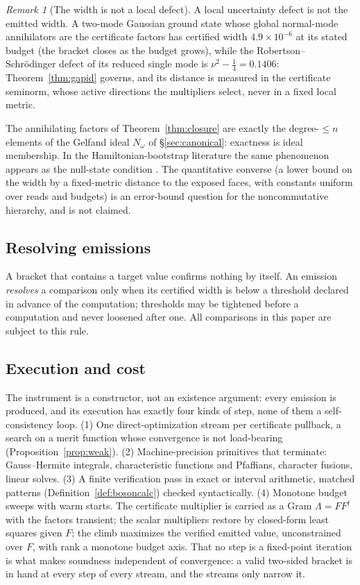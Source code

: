 \documentclass[11pt]{article}
\theoremstyle{definition}
\theoremstyle{remark}
\newtheorem{remark}[theorem]{Remark}
\begin{document}
\begin{remark}[The width is not a local defect]\label{rem:widthdefect}
A local uncertainty defect is not the emitted width.  A two-mode Gaussian
ground state whose global normal-mode annihilators are the certificate
factors has certified width $4.9\times10^{-6}$ at its stated budget (the
bracket closes as the budget grows), while the
Robertson--Schr\"odinger defect of its reduced single mode is $\nu^2 -
\tfrac14 = 0.1406$: Theorem~\ref{thm:gapid} governs, and its distance is
measured in the certificate seminorm, whose active directions the
multipliers select, never in a fixed local metric.
\end{remark}

The annihilating factors of Theorem~\ref{thm:closure} are exactly the
degree-$\le n$ elements of the Gelfand ideal $N_\omega$ of
\S\ref{sec:canonical}: exactness is ideal membership.  In the
Hamiltonian-bootstrap literature the same phenomenon appears as the
null-state condition \cite{guoli}.  The quantitative
converse (a lower bound on the width by a fixed-metric distance to the
exposed faces, with constants uniform over reads and budgets) is an
error-bound question for the noncommutative hierarchy, and is not claimed.

\subsection{Resolving emissions}\label{sec:resolving}
A bracket that contains a target value confirms nothing by itself.  An
emission \emph{resolves} a comparison only when its certified width is
below a threshold declared in advance of the computation; thresholds may
be tightened before a computation and never loosened after one.  All
comparisons in this paper are subject to this rule.

\subsection{Execution and cost}\label{sec:execution}
The instrument is a constructor, not an existence argument: every emission
is produced, and its execution has exactly four kinds of step, none of them
a self-consistency loop.  (1) One direct-optimization stream per
certificate pullback, a search on a merit function whose convergence is not
load-bearing (Proposition~\ref{prop:weak}).  (2) Machine-precision
primitives that terminate: Gauss--Hermite integrals, characteristic
functions and Pfaffians, character fusions, linear solves.  (3) A finite
verification pass in exact or interval arithmetic, matched patterns
(Definition~\ref{def:bosoncalc}) checked syntactically.  (4) Monotone budget
sweeps with warm starts.  The certificate multiplier is carried as a Gram
$\Lambda = FF^\dagger$ with the factors transient; the scalar multipliers
restore by closed-form least squares given $F$; the climb maximizes the
verified emitted value, unconstrained over $F$, with rank a monotone budget
axis.  That no step is a fixed-point iteration is what makes soundness
independent of convergence: a valid two-sided bracket is in hand at every
step of every stream, and the streams only narrow it.
\end{document}
